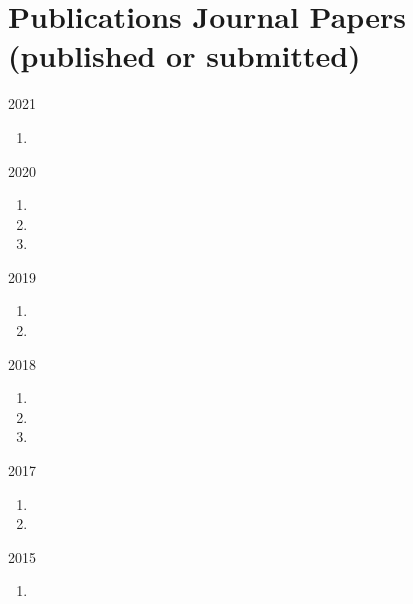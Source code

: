 \section*{Publications {\small Journal Papers (published or submitted)}}

\begin{paracol}{2}
  2021
\switchcolumn
  \begin{enumerate}
    \item {}
    \setcounter{pubcounter}{\theenumi}
  \end{enumerate}
\end{paracol}

\begin{paracol}{2}
  2020
\switchcolumn
  \begin{enumerate}
    \setcounter{enumi}{\thepubcounter}
    \item {}
    \item {}
    \item {}
    \setcounter{pubcounter}{\theenumi}
  \end{enumerate}
\end{paracol}

\begin{paracol}{2}
  2019
\switchcolumn
  \begin{enumerate}
    \setcounter{enumi}{\thepubcounter}
    \item {}
    \item {}
    \setcounter{pubcounter}{\theenumi}
  \end{enumerate}
\end{paracol}

\begin{paracol}{2}
  2018
\switchcolumn
  \begin{enumerate}
    \setcounter{enumi}{\thepubcounter}
    \item {}
    \item {}
    \item {}
    \setcounter{pubcounter}{\theenumi}
  \end{enumerate}
\end{paracol}

\begin{paracol}{2}
  2017
\switchcolumn
  \begin{enumerate}
    \setcounter{enumi}{\thepubcounter}
    \item {}
    \item {}
    \setcounter{pubcounter}{\theenumi}
  \end{enumerate}
\end{paracol}

\begin{paracol}{2}
  2015
\switchcolumn
  \begin{enumerate}
    \setcounter{enumi}{\thepubcounter}
    \item {}
    \setcounter{pubcounter}{\theenumi}
  \end{enumerate}
\end{paracol}